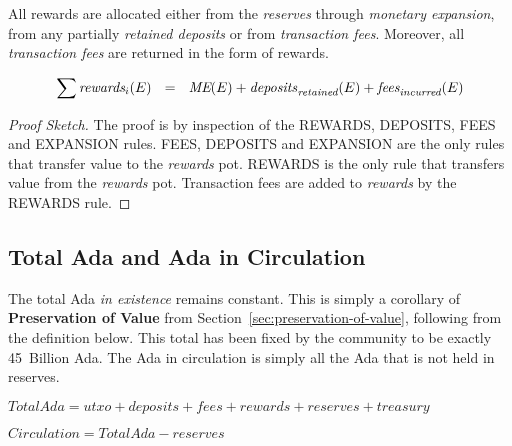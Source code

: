 All rewards are allocated either from the \emph{reserves} through \emph{monetary expansion},
from any partially \emph{retained deposits} or from \emph{transaction fees}.  Moreover, all
\emph{transaction fees} are returned in the form of rewards.

$$
\sum{\textit{rewards}_i}(E)~~=~~\textit{ME}(E) + \mathit{deposits}_\textit{retained}(E) + \textit{fees}_\textit{incurred}(E)
$$

\begin{proof}[Proof Sketch]

\noindent
The proof is by inspection of the REWARDS, DEPOSITS, FEES and EXPANSION rules.
FEES, DEPOSITS and EXPANSION are the only rules that transfer value to the \textit{rewards} pot.
REWARDS is the only rule that transfers value from the \textit{rewards} pot.
Transaction fees are added to \emph{rewards} by the REWARDS rule.
\end{proof}

\subsection{Total Ada and Ada in Circulation}

The total Ada \emph{in existence} remains constant.  This is simply a corollary of \textbf{Preservation of Value} from Section~\ref{sec:preservation-of-value},
following from the definition below.  This total has been fixed by the community to be exactly 45~Billion Ada.
The Ada in circulation is simply all the Ada that is not held in reserves. 


\begin{definition}
  $\textit{TotalAda} = \textit{utxo} + \textit{deposits} + \textit{fees} + \textit{rewards} + \textit{reserves} + \textit{treasury}$
\end{definition}


\begin{definition}
$\textit{Circulation} = \textit{TotalAda} - \textit{reserves}$
\end{definition}


